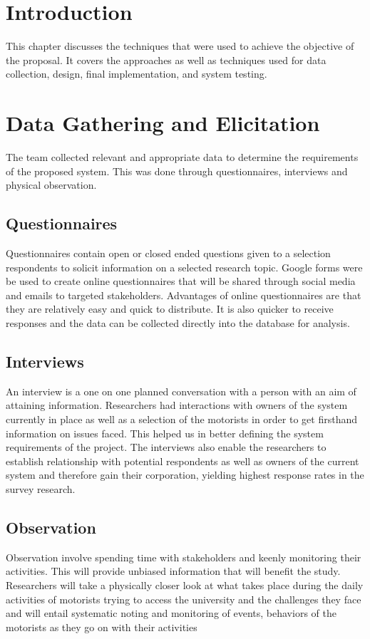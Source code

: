 \section{Introduction}
This chapter discusses the techniques that were used to achieve the objective of the proposal. It covers the approaches as well as techniques used for data collection, design, final implementation, and system testing.


\section{Data Gathering and Elicitation}
The team collected relevant and appropriate data to determine the requirements of the proposed system. This was done through questionnaires, interviews and physical observation\cite{kothari_research_2004}.

\subsection{Questionnaires}
Questionnaires contain open or closed ended questions given to a selection respondents to solicit information on a selected research topic\cite{bartram_using_2019}. Google forms were be used to create online questionnaires that will be shared through social media and emails to targeted stakeholders. Advantages of online questionnaires are that they are relatively easy and quick to distribute. It is also quicker to receive responses and the data can be collected directly into the database for analysis.

\subsection{Interviews}
An interview is a one on one planned conversation with a person with an aim of attaining information. Researchers had interactions with owners of the system currently in place as well as a selection of the motorists in order to get firsthand information on issues faced. This helped us in better defining the system requirements of the project. The interviews also enable the researchers to establish relationship with potential respondents as well as owners of the current system and therefore gain their corporation,  yielding highest response rates in the survey research.

\subsection{Observation}
Observation involve spending time with stakeholders and keenly monitoring their activities. This will provide unbiased information that will benefit the study. Researchers will take a physically closer look at what takes place during the daily activities of motorists trying to access the university and the challenges they face and will entail systematic noting and monitoring of events, behaviors of the motorists as they go on with their activities



